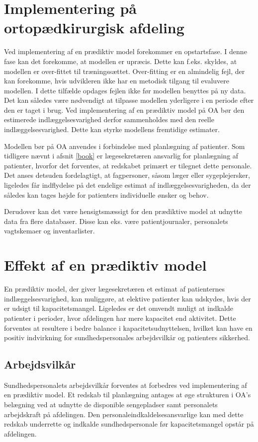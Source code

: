\section{Implementering på ortopædkirurgisk afdeling}
Ved implementering af en prædiktiv model forekommer en opstartsfase. I denne fase kan det forekomme, at modellen er upræcis. Dette kan f.eks. skyldes, at modellen er over-fittet til træningssættet. Over-fitting er en almindelig fejl, der kan forekomme, hvis udvikleren ikke har en metodisk tilgang til evaluvere modellen. I dette tilfælde opdages fejlen ikke før modellen benyttes på ny data.  
Det kan således være nødvendigt at tilpasse modellen yderligere i en periode efter den er taget i brug.\cite{Kuhn2013} Ved implementering af en prædiktiv model på OA bør den estimerede indlæggelsesvarighed derfor sammenholdes med den reelle indlæggelsesvarighed. Dette kan styrke modellens fremtidige estimater.

Modellen bør på OA anvendes i forbindelse med planlægning af patienter. Som tidligere nævnt i afsnit \ref{book} er lægesekretæren ansvarlig for planlægning af patienter, hvorfor det forventes, at redskabet primært er tilegnet dette personale. Det anses detsuden fordelagtigt, at fagpersoner, såsom læger eller sygeplejersker, ligeledes får indflydelse på det endelige estimat af indlæggelsesvarigheden, da der således kan tages højde for patienters individuelle ønsker og behov.

Derudover kan det være hensigtsmæssigt for den prædiktive model at udnytte data fra flere databaser. Disse kan eks. være patientjournaler, personalets vagtskemaer og inventarlister.

\section{Effekt af en prædiktiv model}
En prædiktiv model, der giver lægesekretæren et estimat af patienternes indlæggelsesvarighed, kan muliggøre, at elektive patienter kan udskydes, hvis der er udsigt til kapacitetsmangel. Ligeledes er det omvendt muligt at indkalde patienter i perioder, hvor afdelingen har mere kapacitet end aktivitet. Dette forventes at resultere i bedre balance i kapacitetsudnyttelsen, hvilket kan have en positiv indvirkning for sundhedspersonales arbejdsvilkår og patienters sikkerhed. 


\subsection{Arbejdsvilkår} \label{sundper}
Sundhedspersonalets arbejdsvilkår forventes at forbedres ved implementering af en prædiktiv model. Et redskab til planlægning antages at øge strukturen i OA's belægning ved at udnytte de disponible sengepladser samt personalets arbejdskraft på afdelingen. Den personaleindkaldelsesansvarlige kan med dette redskab underrette og indkalde sundhedspersonale før kapacitetsmangel opstår på afdelingen.

